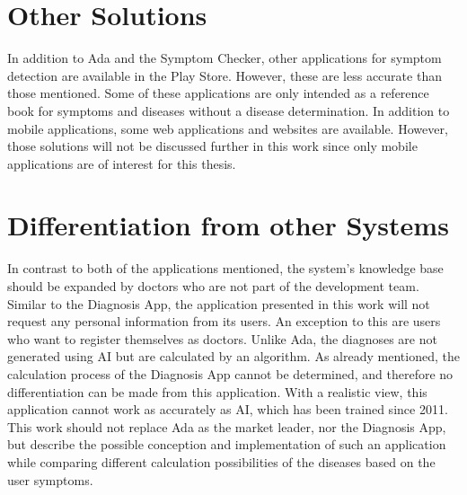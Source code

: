 \section{Other Solutions}
In addition to Ada and the Symptom Checker, other applications for symptom detection are available in the Play Store. However, these are less accurate than those mentioned. Some of these applications are only intended as a reference book for symptoms and diseases without a disease determination. In addition to mobile applications, some web applications and websites are available. However, those solutions will not be discussed further in this work since only mobile applications are of interest for this thesis.

\section{Differentiation from other Systems}
In contrast to both of the applications mentioned, the system's knowledge base should be expanded by doctors who are not part of the development team. Similar to the Diagnosis App, the application presented in this work will not request any personal information from its users. An exception to this are users who want to register themselves as doctors. Unlike Ada, the diagnoses are not generated using AI but are calculated by an algorithm. As already mentioned, the calculation process of the Diagnosis App cannot be determined, and therefore no differentiation can be made from this application. With a realistic view, this application cannot work as accurately as AI, which has been trained since 2011. This work should not replace Ada as the market leader, nor the Diagnosis App, but describe the possible conception and implementation of such an application while comparing different calculation possibilities of the diseases based on the user symptoms.




